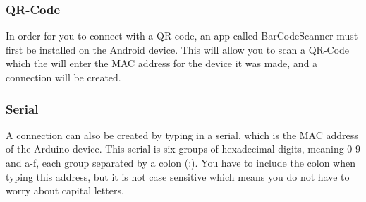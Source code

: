 			\subsubsection{QR-Code}
				In order for you to connect with a QR-code, an app called BarCodeScanner must first be installed on the Android device. This will allow you to scan a QR-Code which the will enter the MAC address for the device it was made, and a connection will be created.\\

			\subsubsection{Serial}
				A connection can also be created by typing in a serial, which is the MAC address of the Arduino device. This serial is six groups of hexadecimal digits, meaning 0-9 and a-f, each group separated by a colon (:). You have to include the colon when typing this address, but it is not case sensitive which means you do not have to worry about capital letters.\\

